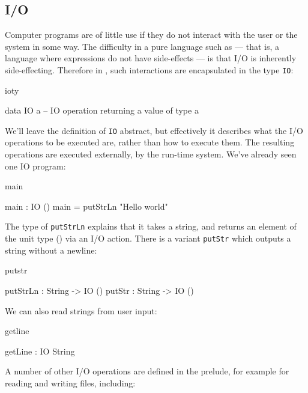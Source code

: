 \subsection{I/O}

Computer programs are of little use if they do not interact with the user or
the system in some way. The difficulty in a pure language such as \Idris{} ---
that is, a language where expressions do not have side-effects --- is that I/O
is inherently side-effecting. Therefore in \Idris{}, such interactions are
encapsulated in the type \texttt{IO}:

\begin{SaveVerbatim}{ioty}

data IO a -- IO operation returning a value of type a

\end{SaveVerbatim}

\noindent
We'll leave the definition of \texttt{IO} abstract, but effectively it describes what
the I/O operations to be executed are, rather than how to execute them. The
resulting operations are executed externally,
by the run-time system. We've already seen one IO
program:

\begin{SaveVerbatim}{main}

main : IO ()
main = putStrLn "Hello world"

\end{SaveVerbatim}

\noindent
The type of \texttt{putStrLn} explains that it takes a string, and returns an
element of the unit type () via an I/O action. There is a variant \texttt{putStr} which
outputs a string without a newline:

\begin{SaveVerbatim}{putstr}

putStrLn : String -> IO ()
putStr   : String -> IO ()

\end{SaveVerbatim}

We can also read strings from user input:

\begin{SaveVerbatim}{getline}

getLine : IO String

\end{SaveVerbatim}

\noindent
A number of other I/O operations are defined in the prelude, for example for reading and
writing files, including:

